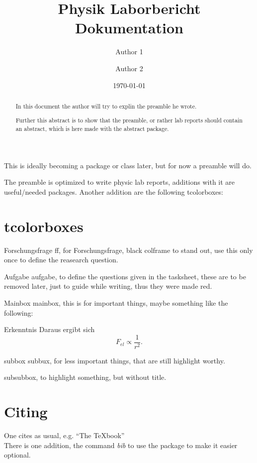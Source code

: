 \documentclass[twocolumn]{article}
\author[1]{Author 1}
\author[2]{Author 2}
\affil[1]{Author institution}
\affil[2]{Another Author's institution}
\title{Physik Laborbericht Dokumentation}
\date{\today}
\begin{document}
\maketitle


\begin{abstract}
  In this document the author will try to explin the preamble he wrote.

  Further this abstract is to show that the preamble, or rather lab reports
  should contain an abstract, which is here made with the abstract package.
\end{abstract}

This is ideally becoming a package or class later, but for now a preamble will do.

The preamble is optimized to write physic lab reports, additions with it are
useful/needed packages. Another addition are the following tcolorboxes:
    



\section{tcolorboxes}
\label{sec:tcol}


\begin{ff}{Forschungsfrage}
    ff, for Forschungsfrage, black colframe to stand out, use this only once to define the reasearch question.
\label{Forschungsfrage}
\end{ff}


\begin{aufgabe}{Aufgabe}
    aufgabe, to define the questions given in the tasksheet, these are to be
    removed later, just to guide while writing, thus they were made red.
\label{aufgabe-1}
\end{aufgabe}


\begin{mainbox}{Mainbox}
    mainbox, this is for important things, maybe something like the following:

\begin{mainbox}{Erkenntnis}
    Daraus ergibt sich
    \[ F_{el} \propto \frac{1}{r^2} .\] 
\end{mainbox}
\end{mainbox}


\begin{subbox}{subbox}
    subbux, for less important things, that are still highlight worthy.
\end{subbox}

\begin{subsubbox}
    subsubbox, to highlight something, but without title.
\end{subsubbox}




\section{Citing}
One cites as usual, e.g. ``The \TeX{}book''~\cite{knuth1986texbook}\\
There is one addition, the command \textit{bib} to use the package to make it easier optional.




\printbibliography
\end{document}
